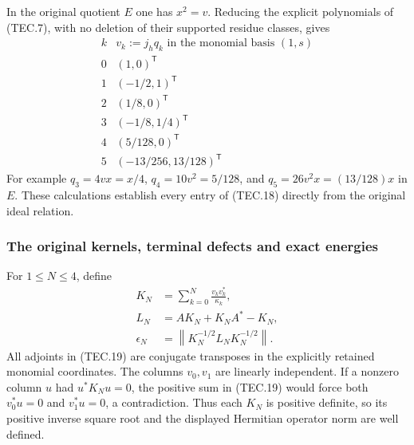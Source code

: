 In the original quotient \(E\) one has \(x^2=v\).  Reducing the
explicit polynomials of (TEC.7), with no deletion of their supported
residue classes, gives
\[
\begin{array}{c|c}
k&v_k:=j_hq_k\text{ in the monomial basis }(1,s)\\\hline
0&(1,0)^{\mathsf T}\\
1&(-1/2,1)^{\mathsf T}\\
2&(1/8,0)^{\mathsf T}\\
3&(-1/8,1/4)^{\mathsf T}\\
4&(5/128,0)^{\mathsf T}\\
5&(-13/256,13/128)^{\mathsf T}
\end{array}                                                       \tag{TEC.18}
\]
For example \(q_3=4vx=x/4\), \(q_4=10v^2=5/128\), and
\(q_5=26v^2x=(13/128)x\) in \(E\).  These calculations establish
every entry of (TEC.18) directly from the original ideal relation.

\subsubsection{The original kernels, terminal defects and exact energies}

For \(1\leq N\leq4\), define
\[
\begin{aligned}
 K_N&=\sum_{k=0}^N\frac{v_kv_k^*}{\kappa_k},\\
 L_N&=AK_N+K_NA^*-K_N,\\
 \epsilon_N&=\left\|K_N^{-1/2}L_NK_N^{-1/2}\right\|.
\end{aligned}                                                     \tag{TEC.19}
\]
All adjoints in (TEC.19) are conjugate transposes in the explicitly
retained monomial coordinates.  The columns \(v_0,v_1\) are linearly
independent.  If a nonzero column \(u\) had \(u^*K_Nu=0\), the
positive sum in (TEC.19) would force both \(v_0^*u=0\) and
\(v_1^*u=0\), a contradiction.  Thus each \(K_N\) is positive
definite, so its positive inverse square root and the displayed
Hermitian operator norm are well defined.

